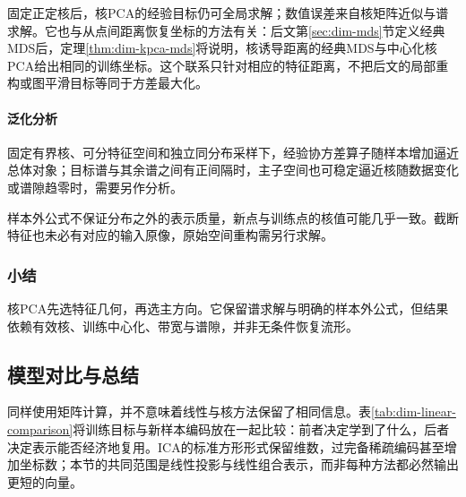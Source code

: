 固定正定核后，核PCA的经验目标仍可全局求解；数值误差来自核矩阵近似与谱求解。它也与从点间距离恢复坐标的方法有关：后文第\ref{sec:dim-mds}节定义经典MDS后，定理\ref{thm:dim-kpca-mds}将说明，核诱导距离的经典MDS与中心化核PCA给出相同的训练坐标。这个联系只针对相应的特征距离，不把后文的局部重构或图平滑目标等同于方差最大化。

\paragraph{泛化分析}

固定有界核、可分特征空间和独立同分布采样下，经验协方差算子随样本增加逼近总体对象；目标谱与其余谱之间有正间隔时，主子空间也可稳定逼近核随数据变化或谱隙趋零时，需要另作分析。

样本外公式不保证分布之外的表示质量，新点与训练点的核值可能几乎一致。截断特征也未必有对应的输入原像，原始空间重构需另行求解。

\subsubsection{小结}

核PCA先选特征几何，再选主方向。它保留谱求解与明确的样本外公式，但结果依赖有效核、训练中心化、带宽与谱隙，并非无条件恢复流形。

\subsection{模型对比与总结}
\label{sec:dim-linear-comparison}

同样使用矩阵计算，并不意味着线性与核方法保留了相同信息。表\ref{tab:dim-linear-comparison}将训练目标与新样本编码放在一起比较：前者决定学到了什么，后者决定表示能否经济地复用。ICA的标准方形形式保留维数，过完备稀疏编码甚至增加坐标数；本节的共同范围是线性投影与线性组合表示，而非每种方法都必然输出更短的向量。


